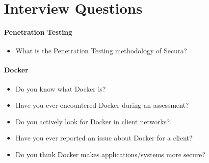 \chapter{Interview Questions}\label{appendix:Interview-Questions}

\subsubsection{Penetration Testing}
\begin{itemize}
    \item What is the Penetration Testing methodology of Secura?
\end{itemize}


\subsubsection{Docker}
\begin{itemize}
    \item Do you know what Docker is?
    \item Have you ever encountered Docker during an assessment?
    \item Do you actively look for Docker in client networks?
    \item Have you ever reported an issue about Docker for a client?
    \item Do you think Docker makes applications/systems more secure?
\end{itemize}
